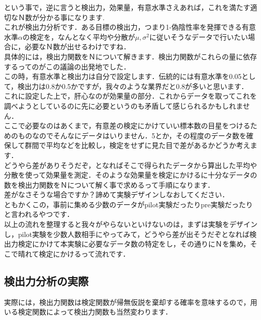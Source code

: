 \documentclass[11pt,a4paper]{ujreport} 	%
\begin{document}
という事で，逆に言うと検出力，効果量，有意水準さえあれば，これを満たす適切なＮ数が分かる事になります.\\

これが検出力分析です．ある目標の検出力，つまり1-偽陰性率を発揮できる有意水準$\alpha$の検定を，なんとなく平均や分散が$\mu,\sigma^2$に従いそうなデータで行いたい場合に，必要なＮ数が出せるわけですね．\\

具体的には，検出力関数をＮについて解きます．検出力関数がこれらの量に依存するってのがこの議論の出発地でした．\\

この時，有意水準と検出力は自分で設定します．伝統的には有意水準を0.05として，検出力は0.8か0.5かですが，我々のような業界だと0.8が多いと思います．\\

これに設定した上で，肝心なのが効果量の部分．これからデータを取ってこれを調べようとしているのに先に必要というのも矛盾して感じられるかもしれません．\\

ここで必要なのはあくまで，有意差の検定にかけていい標本数の目星をつけるためのものなのでそんなにデータはいりません．5とか，その程度のデータ数を確保して群間で平均などを比較し，検定をせずに見た目で差があるかどうか考えます．\\

どうやら差がありそうだぞ，となればそこで得られたデータから算出した平均や分散を使って効果量を測定．そのような効果量を検定にかけるに十分なデータの数を検出力関数をＮについて解く事で求めるって手順になります．\\

差がなさそうな場合ですか？諦めて実験デザインしなおしてください．\\

ともかくこの，事前に集める少数のデータがpilot実験だったりpre実験だったりと言われるやつです．\\

以上の流れを整理すると我々がやらないといけないのは，まずは実験をデザインし，pilot実験を少数人数相手にやってみて，どうやら差が出そうだぞとなれば検出力検定にかけて本実験に必要なデータ数の特定をし，その通りにＮを集め，そこで晴れて検定にかけるって流れです．

\subsection{検出力分析の実際}
実際には，検出力関数は検定関数が帰無仮説を棄却する確率を意味するので，用いる検定関数によって検出力関数も当然変わります．\\
\end{document}
